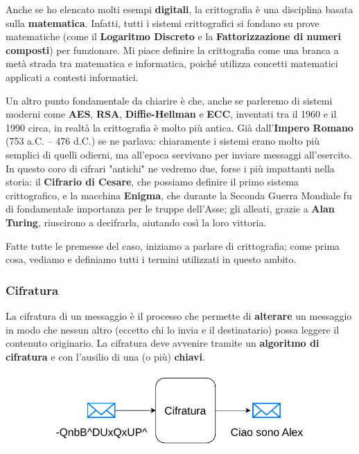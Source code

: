 \documentclass{report}
\begin{document}
Anche se ho elencato molti esempi \textbf{digitali}, la crittografia è una disciplina basata sulla \textbf{matematica}. Infatti, tutti i sistemi crittografici si fondano su prove matematiche (come il \textbf{Logaritmo Discreto} e la \textbf{Fattorizzazione di numeri composti}) per funzionare. Mi piace definire la crittografia come una branca a metà strada tra matematica e informatica, poiché utilizza concetti matematici applicati a contesti informatici.

\newpage

Un altro punto fondamentale da chiarire è che, anche se parleremo di sistemi moderni come \textbf{AES}, \textbf{RSA}, \textbf{Diffie-Hellman} e \textbf{ECC}, inventati tra il 1960 e il 1990 circa, in realtà la crittografia è molto più antica. Già dall’\textbf{Impero Romano} (753 a.C. – 476 d.C.) se ne parlava: chiaramente i sistemi erano molto più semplici di quelli odierni, ma all’epoca servivano per inviare messaggi all’esercito. In questo coro di cifrari "antichi" ne vedremo due, forse i più impattanti nella storia: il \textbf{Cifrario di Cesare}, che possiamo definire il primo sistema crittografico, e la macchina \textbf{Enigma}, che durante la Seconda Guerra Mondiale fu di fondamentale importanza per le truppe dell’Asse; gli alleati, grazie a \textbf{Alan Turing}, riuscirono a decifrarla, aiutando così la loro vittoria.

Fatte tutte le premesse del caso, iniziamo a parlare di crittografia; come prima cosa, vediamo e definiamo tutti i termini utilizzati in questo ambito.


\subsubsection{Cifratura} 

La cifratura di un messaggio è il processo che permette di \textbf{alterare} un messaggio in modo che nessun altro (eccetto chi lo invia e il destinatario) possa leggere il contenuto originario. La cifratura deve avvenire tramite un \textbf{algoritmo di cifratura} e con l’ausilio di una (o più) \textbf{chiavi}.


\begin{figure}[h]
     \centering
    \includegraphics[width=0.8\linewidth]{logos/cripto2.pdf}
\end{figure}
\end{document}
